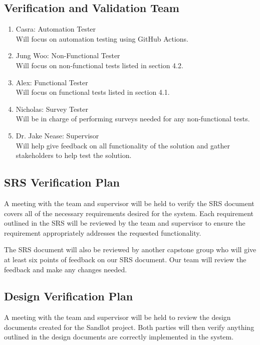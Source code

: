 \documentclass[12pt, titlepage]{article}
\begin{document}
\subsection{Verification and Validation Team}

\begin{enumerate}
  \item Casra: Automation Tester\\
  Will focus on automation testing using GitHub Actions.
  \item Jung Woo: Non-Functional Tester\\
  Will focus on non-functional tests listed in section 4.2.
  \item Alex: Functional Tester\\
  Will focus on functional tests listed in section 4.1.
  \item Nicholas: Survey Tester\\
  Will be in charge of performing surveys needed for any non-functional tests.
  \item Dr. Jake Nease: Supervisor\\
  Will help give feedback on all functionality of the solution and gather
  stakeholders to help test the solution.
\end{enumerate}

\subsection{SRS Verification Plan}

A meeting with the team and supervisor will be held to verify the SRS document covers all of
the necessary requirements desired for the system. Each requirement outlined in the SRS will
be reviewed by the team and supervisor to ensure the requirement appropriately addresses the
requested functionality.

The SRS document will also be reviewed by another capstone group who will give
at least six points of feedback on our SRS document. Our team will review the
feedback and make any changes needed.

\subsection{Design Verification Plan}

A meeting with the team and supervisor will be held to review the design documents created
for the Sandlot project. Both parties will then verify anything outlined in the design
documents are correctly implemented in the system.
\end{document}
